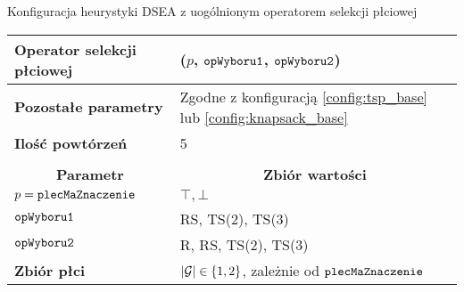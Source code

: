 \documentclass[./FM_mgr.tex]{subfiles}
\begin{document}
\begin{config}
	\caption{Konfiguracja heurystyki DSEA z uogólnionym operatorem selekcji płciowej \label{config:dsea_general}}
	\centering
	\begin{tabularx}{\linewidth}{lX}
		\hline
		\multicolumn{1}{|l|}{\textbf{Operator selekcji płciowej}} &
		\multicolumn{1}{l|}{\opName{stdGenSel}($p$, $\mathtt{opWyboru1}$, $\mathtt{opWyboru2}$)} \\ 
		\hline
		\multicolumn{1}{|l|}{\textbf{Pozostałe parametry}} &
		\multicolumn{1}{l|}{Zgodne z konfiguracją \ref{config:tsp_base} lub \ref{config:knapsack_base}} \\ 
		\hline
		\multicolumn{1}{|l|}{\textbf{Ilość powtórzeń}} &
		\multicolumn{1}{l|}{5} \\ 
		\hline
		& \\ 
		\hline
		\multicolumn{1}{|c|}{\textbf{Parametr}} & 
		\multicolumn{1}{c|}{\textbf{Zbiór wartości}} \\ 
		\hline \hline
		\multicolumn{1}{|l|}{$p = \mathtt{plecMaZnaczenie}$} & 
		\multicolumn{1}{l|}{$\top, \bot$} \\
		\hline
		\multicolumn{1}{|l|}{$\mathtt{opWyboru1}$} & 
		\multicolumn{1}{l|}{RS, TS(2), TS(3)} \\ 
		\hline
		\multicolumn{1}{|l|}{$\mathtt{opWyboru2}$} & 
		\multicolumn{1}{l|}{R, RS, TS(2), TS(3)} \\
		\hline
		\multicolumn{1}{|l|}{\textbf{Zbiór płci}} & 
		\multicolumn{1}{l|}{ $|\mathcal{G}| \in \{1, 2\}$, zależnie od $\mathtt{plecMaZnaczenie}$ } \\ 
		\hline
	\end{tabularx}
\end{config}
\end{document}
